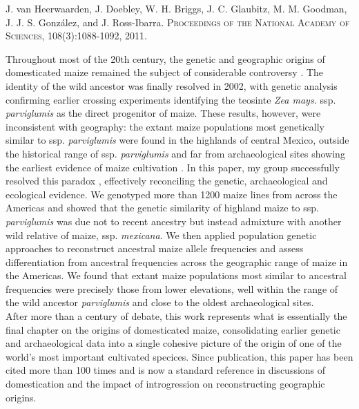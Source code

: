 \documentclass[11pt,letterpaper]{article}
\begin{document}
\large{ 
J. van Heerwaarden, J. Doebley, W. H. Briggs, J. C. Glaubitz, M. M. Goodman, J. J. S. Gonz\'{a}lez, and J. Ross-Ibarra. 
\textsc{Proceedings of the National Academy of Sciences}, 108(3):1088-1092, 2011.}

\vspace{1cm}

\noindent Throughout most of the 20th century, the genetic and geographic origins of domesticated maize remained the subject of considerable controversy \citep{doebley2004genetics}. 
The identity of the wild ancestor was finally resolved in 2002, with genetic analysis \citep{matsuoka2002single} confirming earlier crossing experiments \citep{beadle1972mystery} identifying the teosinte \emph{Zea mays.} ssp. \emph{parviglumis} as the direct progenitor of maize. 
These results, however, were inconsistent with geography: the extant maize populations most genetically similar to ssp. \emph{parviglumis} were found in the highlands of central Mexico, outside the historical range of ssp. \emph{parviglumis} \citep{hufford2012inferences} and far from archaeological sites showing the earliest evidence of maize cultivation \citep{hastorf2009rio, piperno2009starch, pohl2007microfossil}.
In this paper, my group successfully resolved this paradox \citep{van2011genetic}, effectively reconciling the genetic, archaeological and ecological evidence.
We genotyped more than 1200 maize lines from across the Americas and showed that the genetic similarity of highland maize to ssp. \emph{parviglumis} was due not to recent ancestry but instead admixture with another wild relative of maize, ssp. \emph{mexicana}.
We then applied population genetic approaches to reconstruct ancestral maize allele frequencies and assess differentiation from ancestral frequencies across the geographic range of maize in the Americas.
We found that extant maize populations most similar to ancestral frequencies were precisely those from lower elevations, well within the range of the wild ancestor \emph{parviglumis} and close to the oldest archaeological sites.\\

\noindent After more than a century of debate, this work represents what is essentially the final chapter on the origins of domesticated maize, consolidating earlier genetic and archaeological data into a single cohesive picture of the origin of one of the world's most important cultivated specices.
Since publication, this paper has been cited more than 100 times and is now a standard reference in discussions of domestication and the impact of introgression on reconstructing geographic origins.


\end{document}
